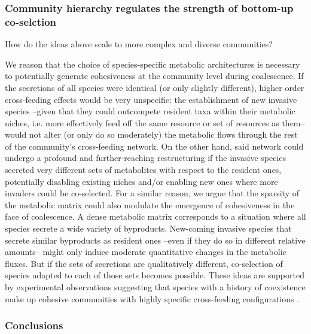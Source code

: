 \documentclass[a4paper,10pt]{article}
\begin{document}
\subsubsection*{Community hierarchy regulates the strength of bottom-up co-selction}

How do the ideas above scale to more complex and diverse communities?

We reason that the choice of species-specific metabolic architectures is necessary to potentially generate
cohesiveness at the community level during coalescence.
If the secretions of all species were identical (or only slightly different),
higher order cross-feeding effects would be very unspecific:
the establishment of new invasive species
--given that they could outcompete resident taxa within their metabolic niches,
i.e. more effectively feed off the same resource or set of resources as them--
would not alter (or only do so moderately)
the metabolic flows through the rest of the community's cross-feeding network.
On the other hand, said network could undergo a profound and further-reaching restructuring
if the invasive species secreted very different sets of metabolites with respect to the resident ones,
potentially disabling existing niches and/or enabling new ones
where more invaders could be co-selected.
For a similar reason, we argue that the sparsity of the metabolic matrix could also modulate
the emergence of cohesiveness in the face of coalescence.
A dense metabolic matrix corresponds to a situation where all species secrete a wide
variety of byproducts.
New-coming invasive species that secrete similar byproducts as resident ones
--even if they do so in different relative amounts--
might only induce moderate quantitative changes in the metabolic fluxes.
But if the sets of secretions are qualitatively different, co-selection of species adapted to
each of those sets becomes possible.
These ideas are supported by experimental observations
suggesting that species with a history of coexistence make up
cohesive communities with highly specific cross-feeding configurations
\cite{Rosenzweig1994,Goldford2018,Estrela2020}.

\subsubsection*{Conclusions}
\end{document}
